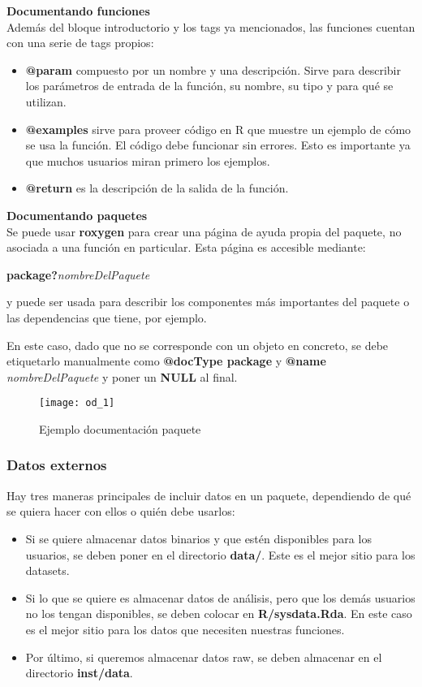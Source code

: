 \textbf{Documentando funciones} \\
Adem\'as del bloque introductorio y los tags ya mencionados, las funciones cuentan con una
serie de tags propios:
\begin{itemize}
    \item \textbf{@param} compuesto por un nombre y una descripci\'on. Sirve para describir los par\'ametros de entrada de la funci\'on, su nombre, su tipo y para qu\'e se utilizan.
    \item \textbf{@examples} sirve para proveer c\'odigo en R que muestre un ejemplo de c\'omo se usa la funci\'on. El c\'odigo debe funcionar sin errores. Esto es importante ya que muchos usuarios miran primero los ejemplos.
    \item \textbf{@return} es la descripci\'on de la salida de la funci\'on.
\end{itemize}

\textbf{Documentando paquetes}\\
Se puede usar \textbf{roxygen} para crear una p\'agina de ayuda propia del paquete, no asociada a
una funci\'on en particular. Esta p\'agina es accesible mediante:
\begin{center}
    \textbf{package?}\textit{nombreDelPaquete} 
\end{center}
y puede ser usada para describir los componentes m\'as importantes del paquete o las
dependencias que tiene, por ejemplo.

En este caso, dado que no se corresponde con un objeto en concreto, se debe etiquetarlo
manualmente como \textbf{@docType package} y \textbf{@name} \textit{nombreDelPaquete} y poner un \textbf{NULL} al final.

\begin{figure}[H]
    \centering
    \texttt{[image: od\_1]}
    \caption{Ejemplo documentaci\'on paquete }
    \label{fig:paquete}
\end{figure} 

\subsubsection{Datos externos}

Hay tres maneras principales de incluir datos en un paquete, dependiendo de qu\'e se quiera
hacer con ellos o qui\'en debe usarlos:

\begin{itemize}
    \item Si se quiere almacenar datos binarios y que est\'en disponibles para los usuarios, se
deben poner en el directorio \textbf{data/}. Este es el mejor sitio para los datasets.
    \item Si lo que se quiere es almacenar datos de an\'alisis, pero que los dem\'as usuarios no
los tengan disponibles, se deben colocar en \textbf{R/sysdata.Rda}. En este caso es el mejor
sitio para los datos que necesiten nuestras funciones.
    \item Por \'ultimo, si queremos almacenar datos raw, se deben almacenar en el directorio
\textbf{inst/data}.
\end{itemize}


